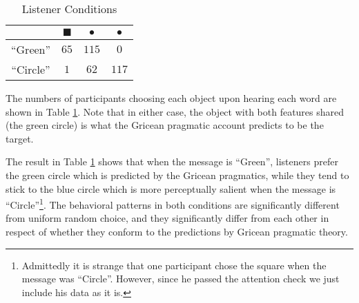 \begin{table}[htb] 
  \caption{Listener Conditions}
  \centering
\begin{tabular}{c|ccc}
   & \quad \textcolor{green!65}{\Large{$\blacksquare$}}&  \textcolor{green!65}{\Huge{$\bullet$}}& \textcolor{blue!65}{\Huge{$\bullet$}} \\ 
     \hline
 ``Green''   \quad  & \quad  $65$      \quad    &   $115$    \quad     & $0$      \\
 ``Circle''   &  \quad $1$        &    $62$        & $117$
  \end{tabular}

  \label{table:listener}
\end{table}

The numbers of participants choosing each object upon hearing each word are shown in Table \ref{table:listener}. Note that in either case, the object with both features shared (the green circle) is what the Gricean pragmatic account predicts to be the target.

The result in Table \ref{table:listener} shows that when the message is ``Green'', listeners prefer the green circle which is predicted by the Gricean pragmatics, while they tend to stick to the blue circle which is more perceptually salient when the message is ``Circle''\footnote{Admittedly it is strange that one participant chose the square when the message was ``Circle''. However, since he passed the attention check we just include his data as it is.}. The behavioral patterns in both conditions are significantly different from uniform random choice, and they significantly differ from each other in respect of whether they conform to the predictions by Gricean pragmatic theory.

